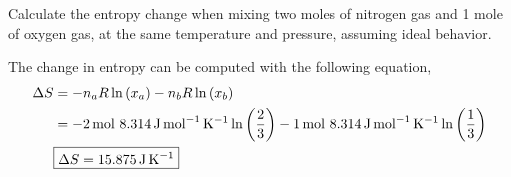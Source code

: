 \documentclass[main.tex]{subfiles}
\begin{document}
\subsection{~}
Calculate the entropy change when mixing two moles of nitrogen gas and 1 mole of oxygen gas, at the same temperature and pressure, assuming ideal behavior.

The change in entropy can be computed with the following equation,
\begin{align*}
    \Delta S &= -n_a R \ln\qty(x_a) -n_b R \ln\qty(x_b)  \\
    &= -\SI{2}{\mol}~\SI{8.314}{\joule\per\mol\per\kelvin}\ln\qty(\frac{2}{3}) -\SI{1}{\mol}~\SI{8.314}{\joule\per\mol\per\kelvin}\ln\qty(\frac{1}{3}) \\
    &\begin{gathered}
        \boxed{\Delta S = \SI{15.875}{\joule\per\kelvin}}
    \end{gathered}
\end{align*}


\end{document}
